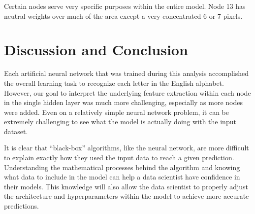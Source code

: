 \documentclass[5p,authoryear]{elsarticle}
\begin{document}
Certain nodes serve very specific purposes within the entire model. 
Node 13 has neutral weights over much of the area except a very concentrated 6 or 7 pixels.

\section{Discussion and Conclusion}

Each artificial neural network that was trained during this analysis accomplished the overall learning task to recognize each letter in the English alphabet. 
However, our goal to interpret the underlying feature extraction within each node in the single hidden layer was much more challenging, especially as more nodes were added. 
Even on a relatively simple neural network problem, it can be extremely challenging to see what the model is actually doing with the input dataset. 

It is clear that “black-box” algorithms, like the neural network, are more difficult to explain exactly how they used the input data to reach a given prediction. 
Understanding the mathematical processes behind the algorithm and knowing what data to include in the model can help a data scientist have confidence in their models. 
This knowledge will also allow the data scientist to properly adjust the architecture and hyperparameters within the model to achieve more accurate predictions. 


\clearpage





\end{document}
